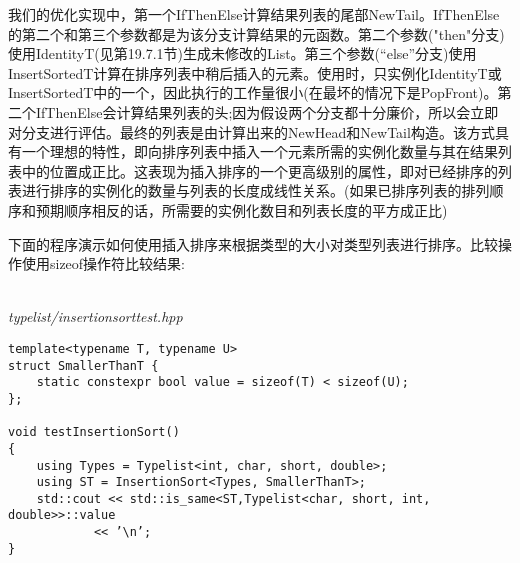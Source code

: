 我们的优化实现中，第一个IfThenElse计算结果列表的尾部NewTail。IfThenElse的第二个和第三个参数都是为该分支计算结果的元函数。第二个参数("then"分支)使用IdentityT(见第19.7.1节)生成未修改的List。第三个参数(“else”分支)使用InsertSortedT计算在排序列表中稍后插入的元素。使用时，只实例化IdentityT或InsertSortedT中的一个，因此执行的工作量很小(在最坏的情况下是PopFront)。第二个IfThenElse会计算结果列表的头;因为假设两个分支都十分廉价，所以会立即对分支进行评估。最终的列表是由计算出来的NewHead和NewTail构造。该方式具有一个理想的特性，即向排序列表中插入一个元素所需的实例化数量与其在结果列表中的位置成正比。这表现为插入排序的一个更高级别的属性，即对已经排序的列表进行排序的实例化的数量与列表的长度成线性关系。(如果已排序列表的排列顺序和预期顺序相反的话，所需要的实例化数目和列表长度的平方成正比)

下面的程序演示如何使用插入排序来根据类型的大小对类型列表进行排序。比较操作使用sizeof操作符比较结果:

\hspace*{\fill} \\ %
\noindent
\textit{typelist/insertionsorttest.hpp}
\begin{lstlisting}[style=styleCXX]
template<typename T, typename U>
struct SmallerThanT {
	static constexpr bool value = sizeof(T) < sizeof(U);
};

void testInsertionSort()
{
	using Types = Typelist<int, char, short, double>;
	using ST = InsertionSort<Types, SmallerThanT>;
	std::cout << std::is_same<ST,Typelist<char, short, int, double>>::value
			<< ’\n’;
}
\end{lstlisting}

























